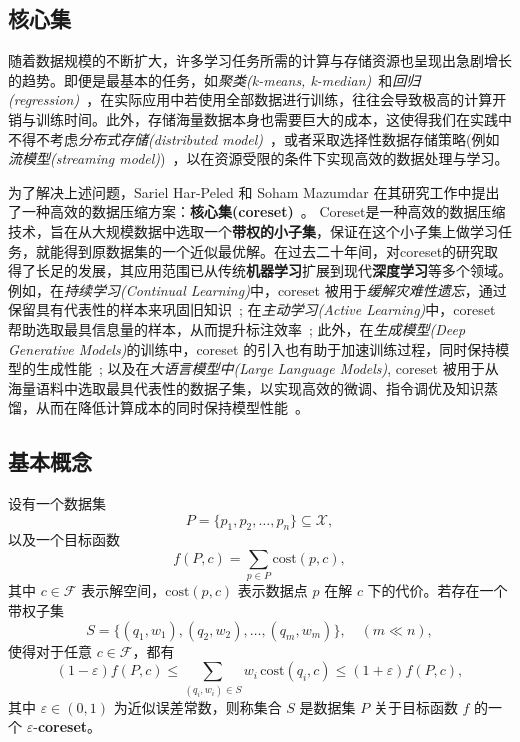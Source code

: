 \documentclass[lang=cn,newtx,10pt,scheme=chinese,chinesefont=nofont,citestyle=gb7714-2015, bibstyle=gb7714-2015]{elegantbook}
\begin{document}
\begin{refsection}
\chapter{核心集}
随着数据规模的不断扩大，许多学习任务所需的计算与存储资源也呈现出急剧增长的趋势。即便是最基本的任务，如\textit{聚类(k-means, k-median)}~\cite{likas2003global, park2009simple}和\textit{回归(regression)}~\cite{lewis2015applied}，在实际应用中若使用全部数据进行训练，往往会导致极高的计算开销与训练时间。此外，存储海量数据本身也需要巨大的成本，这使得我们在实践中不得不考虑\textit{分布式存储(distributed model)}~\cite{camponogara2002distributed, christofides2013distributed}，或者采取选择性数据存储策略(例如\textit{流模型(streaming model)})~\cite{alon1996space}，以在资源受限的条件下实现高效的数据处理与学习。

为了解决上述问题，Sariel Har-Peled 和 Soham Mazumdar 在其研究工作中提出了一种高效的数据压缩方案：\textbf{核心集(coreset)}~\cite{har2004coresets}。 Coreset是一种高效的数据压缩技术，旨在从大规模数据中选取一个\textbf{带权的小子集}，保证在这个小子集上做学习任务，就能得到原数据集的一个近似最优解。在过去二十年间，对coreset的研究取得了长足的发展，其应用范围已从传统\textbf{机器学习}扩展到现代\textbf{深度学习}等多个领域。例如，在\textit{持续学习(Continual Learning)}中，coreset 被用于\textit{缓解灾难性遗忘}，通过保留具有代表性的样本来巩固旧知识~\cite{yoononline, borsos2020coresets}; 在\textit{主动学习(Active Learning)}中，coreset 帮助选取最具信息量的样本，从而提升标注效率~\cite{sener2018active}; 此外，在\textit{生成模型(Deep Generative Models)}的训练中，coreset 的引入也有助于加速训练过程，同时保持模型的生成性能~\cite{sinha2020small, li2025pruning}; 以及在\textit{大语言模型中(Large Language Models)}, coreset 被用于从海量语料中选取最具代表性的数据子集，以实现高效的微调、指令调优及知识蒸馏，从而在降低计算成本的同时保持模型性能~\cite{san2024in2core, nguyen2025mini}。

\section{基本概念}

\begin{definition}[Coreset]
设有一个数据集
\[
P = \{p_1, p_2, \ldots, p_n\} \subseteq \mathcal{X},
\]
以及一个目标函数
\[
f(P, c) = \sum_{p \in P} \mathrm{cost}(p, c),
\]
其中 $c \in \mathcal{F}$ 表示解空间，$\mathrm{cost}(p, c)$ 表示数据点 $p$ 在解 $c$ 下的代价。若存在一个带权子集
\[
S = \{(q_1, w_1), (q_2, w_2), \ldots, (q_m, w_m)\}, \quad (m \ll n),
\]
使得对于任意 $c \in \mathcal{F}$，都有
\[
(1 - \varepsilon) f(P, c) \le \sum_{(q_i, w_i) \in S} w_i \, \mathrm{cost}(q_i, c) \le (1 + \varepsilon) f(P, c),
\]
其中 $\varepsilon \in (0,1)$ 为近似误差常数，则称集合 $S$ 是数据集 $P$ 关于目标函数 $f$ 的一个 $\varepsilon$-\textbf{coreset}。
\end{definition}



\end{refsection}
\end{document}
